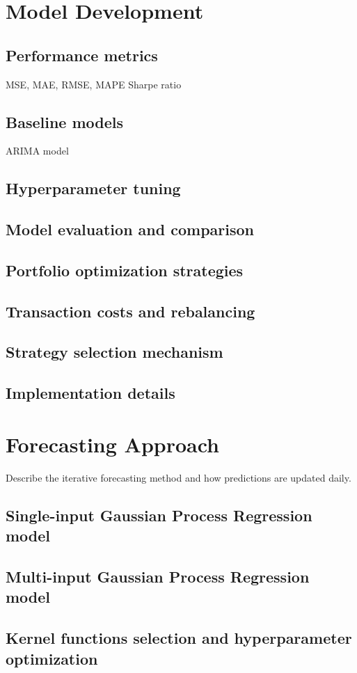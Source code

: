 \section{Model Development}
\subsection{Performance metrics}
MSE, MAE, RMSE, MAPE
Sharpe ratio
\subsection{Baseline models}
ARIMA model
\subsection{Hyperparameter tuning}
\subsection{Model evaluation and comparison}
\subsection{Portfolio optimization strategies}
\subsection{Transaction costs and rebalancing}
\subsection{Strategy selection mechanism}
\subsection{Implementation details}

\section{Forecasting Approach}
Describe the iterative forecasting method and how predictions are updated daily.
\subsection{Single-input Gaussian Process Regression model}
\subsection{Multi-input Gaussian Process Regression model}
\subsection{Kernel functions selection and hyperparameter optimization}
